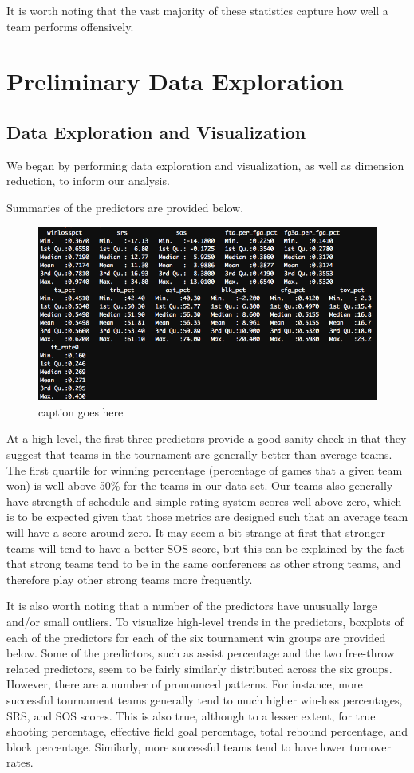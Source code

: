 \documentclass[10pt,a4paper, hidelinks]{article} %
\begin{document}
It is worth noting that the vast majority of these statistics capture how well a team performs offensively.  

\section{Preliminary Data Exploration}

\subsection{Data Exploration and Visualization}
We began by performing data exploration and visualization, as well as dimension reduction, to inform our analysis.

Summaries of the predictors are provided below.

\begin{figure}[H]
	\centering
	\includegraphics[width=0.7\linewidth]{../fig/Summary}
	\caption{caption goes here}
	\label{fig:summary}
\end{figure} 

At a high level, the first three predictors provide a good sanity check in that they suggest that  teams in the tournament are generally better than average teams. The first quartile for winning percentage (percentage of games that a given team won) is well above 50\% for the teams in our data set. Our teams also generally have strength of schedule and simple rating system scores well above zero, which is to be expected given that those metrics are designed such that an average team will have a score around zero. It may seem a bit strange at first that stronger teams will tend to have a better SOS score, but this can be explained by the fact that strong teams tend to be in the same conferences as other strong teams, and therefore play other strong teams more frequently.

It is also worth noting that a number of the predictors have unusually large and/or small outliers. To visualize high-level trends in the predictors, boxplots of each of the predictors for each of the six tournament win groups are provided below. Some of the predictors, such as assist percentage and the two free-throw related predictors, seem to be fairly similarly distributed across the six groups. However, there are a number of pronounced patterns. For instance, more successful tournament teams generally tend to much higher win-loss percentages, SRS, and SOS scores. This is also true, although to a lesser extent, for true shooting percentage, effective field goal percentage, total rebound percentage, and block percentage. Similarly, more successful teams tend to have lower turnover rates. 
\end{document}
